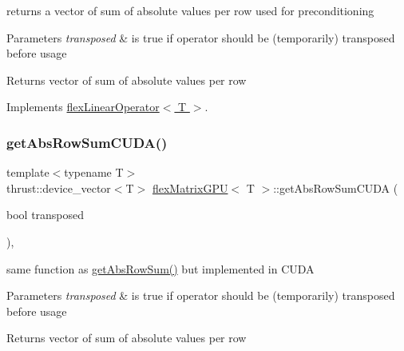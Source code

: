 returns a vector of sum of absolute values per row used for preconditioning 


\begin{DoxyParams}{Parameters}
{\em transposed} & is true if operator should be (temporarily) transposed before usage \\
\hline
\end{DoxyParams}
\begin{DoxyReturn}{Returns}
vector of sum of absolute values per row 
\end{DoxyReturn}


Implements \hyperlink{classflex_linear_operator_ad6caa7b09e6e3c401cadef61b8e2307e}{flex\+Linear\+Operator$<$ T $>$}.

\mbox{\label{classflex_matrix_g_p_u_ab9fceb951d911794d4c70f5045255abd}} 
\subsubsection{\texorpdfstring{get\+Abs\+Row\+Sum\+C\+U\+D\+A()}{getAbsRowSumCUDA()}}
{\footnotesize\ttfamily template$<$typename T$>$ \\
thrust\+::device\+\_\+vector$<$T$>$ \hyperlink{classflex_matrix_g_p_u}{flex\+Matrix\+G\+PU}$<$ T $>$\+::get\+Abs\+Row\+Sum\+C\+U\+DA (\begin{DoxyParamCaption}\item[{bool}]{transposed }\end{DoxyParamCaption})\hspace{0.3cm}{\ttfamily [inline]}, {\ttfamily [virtual]}}



same function as \hyperlink{classflex_matrix_g_p_u_a0a1f19c482243223b8d98165d0b44ccf}{get\+Abs\+Row\+Sum()} but implemented in C\+U\+DA 


\begin{DoxyParams}{Parameters}
{\em transposed} & is true if operator should be (temporarily) transposed before usage \\
\hline
\end{DoxyParams}
\begin{DoxyReturn}{Returns}
vector of sum of absolute values per row 
\end{DoxyReturn}


